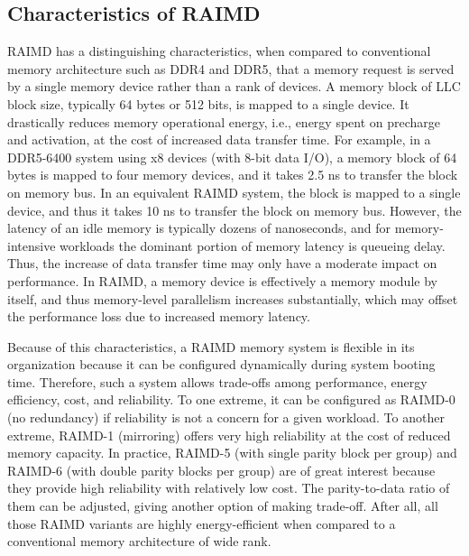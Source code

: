 \documentclass[11pt]{article}
\begin{document}
\subsection{Characteristics of RAIMD}

RAIMD has a distinguishing characteristics, when compared to conventional memory
architecture such as DDR4 and DDR5, that a memory request is served by a single
memory device rather than a rank of devices.  A memory block of LLC block size,
typically 64 bytes or 512 bits, is mapped to a single device.  It drastically
reduces memory operational energy, i.e., energy spent on precharge and
activation, at the cost of increased data transfer time.  For example, in a
DDR5-6400 system using x8 devices (with 8-bit data I/O), a memory block of 64
bytes is mapped to four memory devices, and it takes 2.5 ns to transfer the
block on memory bus.  In an equivalent RAIMD system, the block is mapped to a
single device, and thus it takes 10 ns to transfer the block on memory bus.
However, the latency of an idle memory is typically dozens of nanoseconds, and
for memory-intensive workloads the dominant portion of memory latency is
queueing delay.  Thus, the increase of data transfer time may only have a
moderate impact on performance.  In RAIMD, a memory device is effectively a
memory module by itself, and thus memory-level parallelism increases
substantially, which may offset the performance loss due to increased memory
latency.

Because of this characteristics, a RAIMD memory system is flexible in its
organization because it can be configured dynamically during system booting
time.  Therefore, such a system allows trade-offs among performance, energy
efficiency, cost, and reliability.  To one extreme, it can be configured as
RAIMD-0 (no redundancy) if reliability is not a concern for a given workload.
To another extreme, RAIMD-1 (mirroring) offers very high reliability at the cost
of reduced memory capacity.  In practice, RAIMD-5 (with single parity block per
group) and RAIMD-6 (with double parity blocks per group) are of great interest
because they provide high reliability with relatively low cost.  The
parity-to-data ratio of them can be adjusted, giving another option of making
trade-off.  After all, all those RAIMD variants are highly energy-efficient when
compared to a conventional memory architecture of wide rank.
\end{document}
